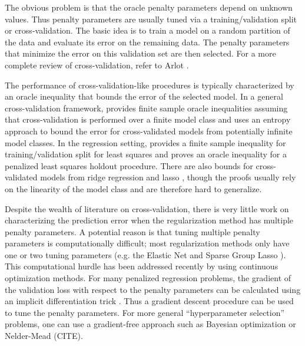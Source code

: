 \documentclass[12pt]{article}
\begin{document}
The obvious problem is that the oracle penalty parameters depend on unknown values. Thus penalty parameters are usually tuned via a training/validation split or cross-validation. The basic idea is to train a model on a random partition of the data and evaluate its error on the remaining data. The penalty parameters that minimize the error on this validation set are then selected. For a more complete review of cross-validation, refer to Arlot \citep{arlot2010survey}.

The performance of cross-validation-like procedures is typically characterized by an oracle inequality that bounds the error of the selected model. In a general cross-validation framework, \citet{van2003unified, van2004asymptotic} provides finite sample oracle inequalities assuming that cross-validation is performed over a finite model class and \citet{lecue2012oracle} uses an entropy approach to bound the error for cross-validated models from potentially infinite model classes. In the regression setting, \citet{gyorfi2006distribution} provides a finite sample inequality for training/validation split for least squares and \citet{wegkamp2003model} proves an oracle inequality for a penalized least squares holdout procedure. There are also bounds for cross-validated models from ridge regression and lasso \citep{golub1979generalized, chetverikov2016cross, chatterjee2015prediction}, though the proofs usually rely on the linearity of the model class and are therefore hard to generalize.

Despite the wealth of literature on cross-validation, there is very little work on characterizing the prediction error when the regularization method has multiple penalty parameters. A potential reason is that tuning multiple penalty parameters is computationally difficult; most regularization methods only have one or two tuning parameters (e.g. the Elastic Net and Sparse Group Lasso \citep{zou2003regression, simon2013sparse}). This computational hurdle has been addressed recently by using continuous optimization methods. For many penalized regression problems, the gradient of the validation loss with respect to the penalty parameters can be calculated using an implicit differentiation trick \citep{bengio2000gradient, foo2008efficient}. Thus a gradient descent procedure can be used to tune the penalty parameters. For more general ``hyperparameter selection'' problems, one can use a gradient-free approach such as Bayesian optimization \citet{snoek2012practical} or Nelder-Mead (CITE).
\end{document}
